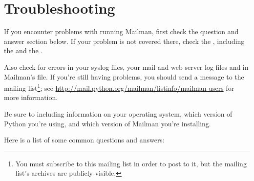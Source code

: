 \documentclass{howto}
\begin{document}
\section{Troubleshooting\label{troubleshooting}}

If you encounter problems with running Mailman, first check the question and
answer section below.  If your problem is not covered there, check the
, including the
 and the
.

Also check for errors in your syslog files, your mail and web server log files
and in Mailman's  file.  If you're still
having problems, you should send a message to the
 mailing list\footnote{You must subscribe to
this mailing list in order to post to it, but the mailing list's archives are
publicly visible.}; see
\url{http://mail.python.org/mailman/listinfo/mailman-users} for more
information.

Be sure to including information on your operating system, which version of
Python you're using, and which version of Mailman you're installing.

Here is a list of some common questions and answers:
\end{document}
